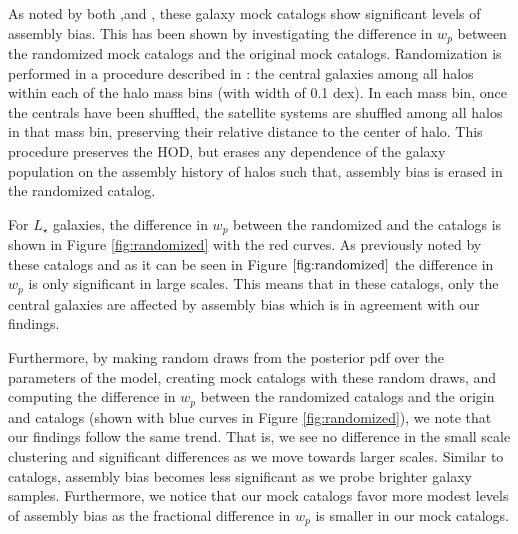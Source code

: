 As noted by both \citealt{arz2014},and \citealt{edHOD-weinberg}, these galaxy mock catalogs show significant levels of assembly bias. This has been shown by investigating the difference in $w_{p}$ between the randomized mock catalogs and the original mock catalogs. Randomization is performed in a procedure described in \citealt{arz2014}: the central galaxies among all halos within each of the halo mass bins (with width of 0.1 dex). In each mass bin, once the centrals have been shuffled, the satellite systems are shuffled among all halos in that mass bin, preserving their relative distance to the center of halo. This procedure preserves the HOD, but erases any dependence of the galaxy population on the assembly history of halos such that, assembly bias is erased in the randomized catalog. 

For $L_{\star}$ galaxies, the difference in $w_{p}$ between the randomized and the \citealt{hw2013} catalogs is shown in Figure \ref{fig:randomized} with the red curves. As previously noted by \citealt{arz2014} these catalogs and as it can be seen in Figure $\ref{fig:randomized}$ the difference in $w_{p}$ is only significant in large scales. This means that in these catalogs, only the central galaxies are affected by assembly bias which is in agreement with our findings. 

Furthermore, by making random draws from the posterior pdf over the parameters of the model, creating mock catalogs with these random draws, and computing the difference in $w_{p}$ between the randomized catalogs and the origin and catalogs (shown with blue curves in Figure \ref{fig:randomized}), we note that our findings follow the same trend. That is, we see no difference in the small scale clustering and significant differences as we move towards larger scales. Similar to \citealt{hw2013} catalogs, assembly bias becomes less significant as we probe brighter galaxy samples. Furthermore, we notice that our mock catalogs favor more modest levels of assembly bias as the fractional difference in $w_{p}$ is smaller in our mock catalogs. 


